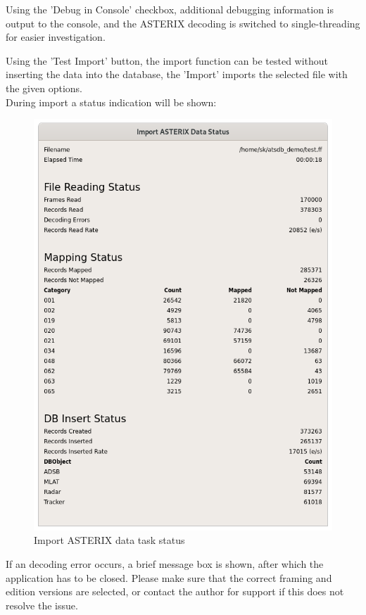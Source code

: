 Using the 'Debug in Console' checkbox, additional debugging information is output to the console, and the ASTERIX decoding is switched to single-threading for easier investigation.

Using the 'Test Import' button, the import function can be tested without inserting the data into the database, the 'Import' imports the selected file with the given options. \\

During import a status indication will be shown:

\begin{figure}[H]
  \center
    \includegraphics[width=12cm]{../screenshots/asterix_import_status.png}
  \caption{Import ASTERIX data task status}
\end{figure}

If an decoding error occurs, a brief message box is shown, after which the application has to be closed. Please make sure that the correct framing and edition versions are selected, or contact the author for support if this does not resolve the issue. \\

